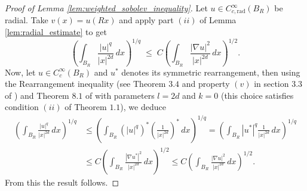 \documentclass[11pt]{article}
\begin{document}
\begin{proof}[Proof of Lemma \ref{lem:weighted_sobolev_inequality}]
Let $u \in C_{c, \mathrm{rad}}^{\infty}(B_R)$ be radial. Take $v(x) = u(Rx)$ and apply part $(ii)$ of Lemma \ref{lem:radial_estimate} to get 
\begin{equation*}
    \left( \int_{B_R} \frac{|u|^q}{|x|^{2d}} \, dx \right)^{1/q} 
\;\leq\; C \left( \int_{B_R} \frac{|\nabla u|^2}{|x|^{2d}} \, dx \right)^{1/2}.
\end{equation*}
Now, let $  u \in C_c^{\infty}(B_R)$ and $u^*$ denotes its symmetric rearrangement, then using the Rearrangement inequality (see Theorem $3.4$ and property $(v)$ in section $3.3$ of \cite{liebloss2001analysis}) and Theorem $8.1$ of \cite{alvino2017radial_polya} with parameters $l = 2d$ and $ k = 0$ (this choice satisfies condition $(ii)$ of Theorem $1.1$), we deduce
\begin{equation*}
\begin{aligned}
 \left( \int_{B_R} \frac{|u|^q}{|x|^{2d}} \, dx \right)^{1/q}  & \leq    \left( \int_{B_R} (|u|^q)^* \left(\frac{1}{|x|^{2d}} \right)^* \, dx \right)^{1/q}  = \left( \int_{B_R} |u^*|^q \frac{1}{|x|^{2d}}  \, dx \right)^{1/q} \\  &\leq C \left( \int_{B_R} \frac{|\nabla u^*|^2}{|x|^{2d}} \, dx \right)^{1/2} \leq C \left( \int_{B_R} \frac{|\nabla u|^2}{|x|^{2d}} \, dx \right)^{1/2}.
\end{aligned}
\end{equation*}
From this the result follows.
\end{proof}
\end{document}
